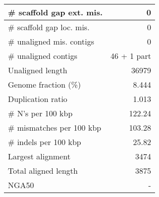 \documentclass[12pt,a4paper]{article}
\begin{document}
\begin{table}[ht]
\begin{center}
\begin{tabular}{|l*{1}{|r}|}
\# scaffold gap ext. mis. & 0 \\ \hline
\# scaffold gap loc. mis. & 0 \\ \hline
\# unaligned mis. contigs & 0 \\ \hline
\# unaligned contigs & 46 + 1 part \\ \hline
Unaligned length & 36979 \\ \hline
Genome fraction (\%) & 8.444 \\ \hline
Duplication ratio & 1.013 \\ \hline
\# N's per 100 kbp & 122.24 \\ \hline
\# mismatches per 100 kbp & 103.28 \\ \hline
\# indels per 100 kbp & 25.82 \\ \hline
Largest alignment & 3474 \\ \hline
Total aligned length & 3875 \\ \hline
NGA50 & - \\ \hline
\end{tabular}
\end{center}
\end{table}
\end{document}
